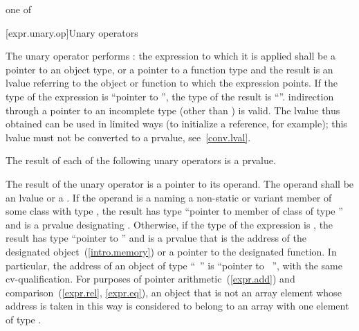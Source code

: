 %
%
%
%
%
%
%
%
%
%
%
%
%
%
%
\begin{bnf}
 \textnormal{one of}\br
    \terminal{*  \&  +  -  !  \tilde}
\end{bnf}

[expr.unary.op]{Unary operators}

\pnum
{}%
%
The unary \tcode{*} operator performs :
%
%
the expression to which it is applied shall be a pointer to an object
type, or a pointer to a function type and the result is an lvalue
referring to the object or function to which the expression points. If
the type of the expression is ``pointer to '', the type of the
result is ``''.
\enternote 
{}%
indirection through a pointer to an incomplete type (other than
 ) is valid. The lvalue thus obtained can be
used in limited ways (to initialize a reference, for example); this
lvalue must not be converted to a prvalue, see~\ref{conv.lval}.
\exitnote 

\pnum
The result of each of the following unary operators is a prvalue.

\pnum
{}%
%
The result of the unary \tcode{\&} operator is a pointer to its operand.
The operand shall be an lvalue or a .
If the operand is a  naming a non-static or variant member 
of some class  with type , the result has type ``pointer to member
of class  of type '' and is a prvalue designating .
Otherwise, if the type of the expression is , the result has type ``pointer to
'' and is a prvalue that is the address of the designated object~(\ref{intro.memory})
or a pointer to the designated function. \enternote In particular, the address of an
object of type ``\cv\ '' is ``pointer to \cv\ '', with the same
cv-qualification. \exitnote
For purposes of pointer arithmetic~(\ref{expr.add}) and
comparison~(\ref{expr.rel}, \ref{expr.eq}),
an object that is not an array element whose
address is taken in this way is considered to belong to an array with one
element of type .
\enterexample 

